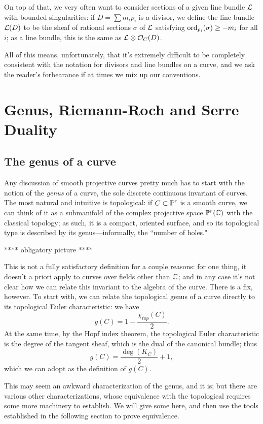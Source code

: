 On top of that, we very often want to consider sections of a given line bundle $\cL$ with bounded singularities: if $D = \sum m_ip_i$ is a divisor, we define the line bundle $\cL(D)$ to be the sheaf of rational sections $\sigma$ of $\cL$ satisfying $\ord_{p_i}(\sigma) \geq -m_i$ for all $i$; as a line bundle, this is the same as $\cL \otimes \cO_C(D)$.

All of this means, unfortunately, that it's extremely difficult to be completely consistent with the notation for divisors and line bundles on a curve, and we ask the reader's forbearance if at times we mix up our conventions.




\section{Genus, Riemann-Roch and Serre Duality}

\subsection{The genus of a curve}

Any discussion of smooth projective curves pretty much has to start with the notion of the \emph{genus} of a curve, the sole discrete continuous invariant of curves. The most natural and intuitive is topological: if $C \subset \PP^r$ is a smooth curve, we can think of it as a submanifold of the complex projective space $\PP^r(\CC)$ with the classical topology; as such, it is a compact, oriented surface, and so its topological type is described by its genus---informally, the ``number of holes."

**** obligatory picture ****

This is not a fully satisfactory definition for a couple reasons: for one thing, it doesn't a priori apply to curves over fields other than $\CC$; and in any case it's not clear how we can relate this invariant to the algebra of the curve. There is a fix, however. To start with, we can relate the topological genus of a curve directly to its topological Euler characteristic: we have
$$
g(C) = 1 - \frac{\chi_{top}(C)}{2}.
$$
At the same time, by the Hopf index theorem, the topological Euler characteristic is the degree of the tangent sheaf, which is the dual of the canonical bundle; thus
$$
g(C) = \frac{\deg(K_C)}{2} + 1,
$$
which we can adopt as the definition of $g(C)$.

This may seem an awkward characterization of the genus, and it is; but there are various other characterizations, whose equivalence with the topological requires some more machinery to establish. We will give some here, and then use the tools established in the following section to prove equivalence.

